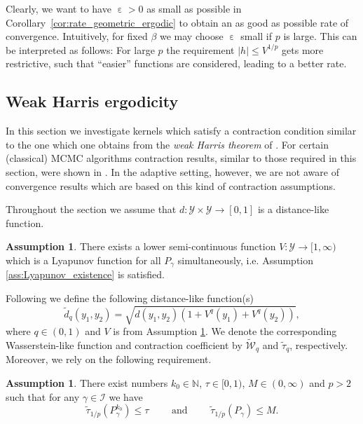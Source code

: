 \documentclass[12pt]{article}
\theoremstyle{definition}
\newtheorem{ass}[thm]{Assumption}
\newcommand{\N}{\mathbb{N}}
\newcommand{\cY}{\mathcal{Y}}
\DeclareMathOperator{\eps}{\varepsilon}
\begin{document}
Clearly, we want to have $\eps>0$ as small as possible in Corollary~\ref{cor:rate_geometric_ergodic} to obtain 
an as good as possible rate of convergence. Intuitively, for fixed $\beta $ we may choose $\eps$ small if $p$ is large. 
This can be interpreted as follows: For large $p$ the requirement $\vert h \vert \leq V^{1/p}$ gets more restrictive, such that ``easier'' functions are considered, leading to a better rate.  

\subsection{Weak Harris ergodicity}
In this section we investigate kernels which satisfy a contraction condition similar to the one which one obtains from the \textit{weak Harris theorem} of \cite{hairer2011asymptotic}.
For certain (classical) MCMC algorithms contraction results, similar to those required in this section, were shown in \cite{hairer2014spectralgaps,hosseini2023spectral}.
In the adaptive setting, however, we are not aware of convergence results which are based on this kind of contraction assumptions.  

Throughout the section we assume that $d \colon \cY \times \cY \to [0,1]$ is a distance-like function. 
\begin{ass}\label{ass:weak_harris_ergodicity_Lyapunov}
	There exists a lower semi-continuous function $V \colon \cY \to [1, \infty)$ which is a Lyapunov function for all $P_\gamma$ simultaneously, i.e. Assumption \ref{ass:Lyapunov_existence} is satisfied.
\end{ass}

Following \cite{hairer2011asymptotic} we define the following distance-like function(s) 
\[
\widetilde{d}_q (y_1, y_2) = \sqrt{d(y_1, y_2) (1+ V^q(y_1) + V^q(y_2))},
\]
where $q \in (0,1)$ and $V$ is from Assumption \ref{ass:weak_harris_ergodicity_Lyapunov}.
We denote the corresponding Wasserstein-like function and contraction coefficient by $\widetilde{\mathcal{W}}_q$ and $\widetilde{\tau}_q$, respectively.
Moreover, we rely on the following requirement.
\begin{ass}\label{ass:weak_harris_ergodicity_contraction}
	There exist numbers $k_0 \in \N$, $\tau \in [0,1)$, $M \in (0, \infty)$ and $p > 2$ such that for any $\gamma \in \mathcal{I}$ we have
	\[ 
	\widetilde{\tau}_{1/p}(P_\gamma^{k_0})
	\leq \tau 
	\qquad
	\text{ and } \qquad
	\widetilde{\tau}_{1/p}(P_\gamma)
	\leq M.
	\]
\end{ass}
\end{document}
